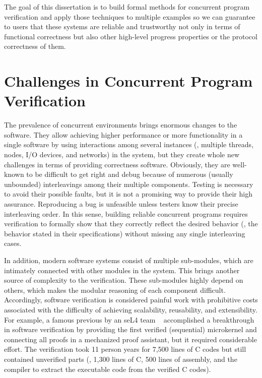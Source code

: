 The goal of this dissertation is to build formal methods for concurrent program verification and apply those techniques to 
multiple examples so we can guarantee to users that these systems are reliable and trustworthy not only in terms of functional correctness 
but also other high-level progress properties or the protocol correctness of them.


\section{Challenges in Concurrent Program Verification}
\label{chapter:introduction:sec:challenges-in-concurrent-program-verification}




The prevalence of concurrent environments brings enormous changes to the software. 
They allow  achieving higher performance or more functionality in a single software by using interactions among several instances 
(\ie, multiple threads, nodes, I/O devices, and networks) in the system, 
but they create whole new challenges in terms of providing correctness software. 
Obviously, they are well-known to be difficult to get right and debug because of numerous (usually unbounded)
 interleavings among their multiple components. Testing is necessary to avoid their possible faults, 
 but it is not a promising way to provide their high assurance. Reproducing a bug is unfeasible unless testers know their precise interleaving order.
In this sense, building reliable concurrent programs requires verification to formally show that they 
correctly reflect the desired behavior (\ie, the behavior stated in their specifications) without missing any single interleaving cases.


In addition, modern software systems consist of multiple sub-modules, 
which are intimately connected with other modules in the system. This brings another source of complexity to the verification. 
These sub-modules highly depend on others, which makes the modular reasoning of each component difficult. 
Accordingly, software verification is considered painful work with prohibitive costs associated with the difficulty of achieving scalability, 
reusability,  and extensibility. 
For example, a famous previous by an seL4 team ~\cite{klein2009sel4} accomplished a breakthrough in software verification 
by providing the first verified (sequential) microkernel and connecting all proofs in a mechanized proof assistant, 
but it required considerable effort. The verification took 11 person years for 7,500 lines of C codes but still contained unverified parts
 (\ie, 1,300 lines of C, 500 lines of assembly, and the compiler to extract the executable code from the verified C codes).


